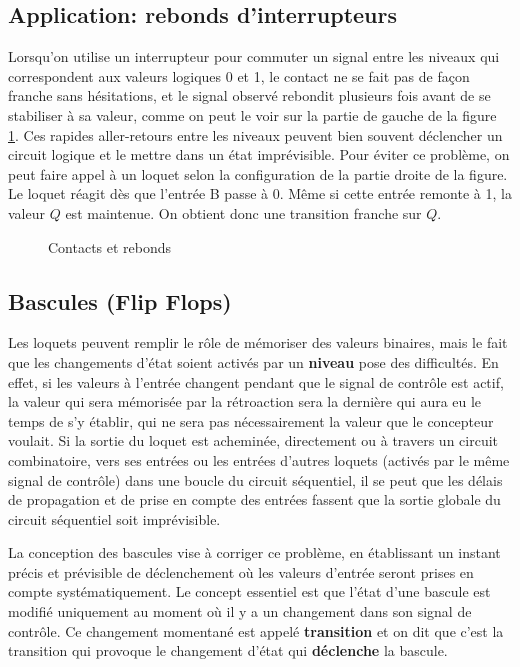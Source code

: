 \documentclass[11pt]{article}
\begin{document}
\subsection{Application: rebonds d'interrupteurs}
\label{sec:org7a182d0}

Lorsqu'on utilise un interrupteur pour commuter un signal entre les
niveaux qui correspondent aux valeurs logiques 0 et 1, le contact ne
se fait pas de façon franche sans hésitations, et le signal observé
rebondit plusieurs fois avant de se stabiliser à sa valeur, comme on
peut le voir sur la partie de gauche de la figure \ref{fig:orgdbacca0}. Ces
rapides aller-retours entre les niveaux peuvent bien souvent
déclencher un circuit logique et le mettre dans un état
imprévisible. Pour éviter ce problème, on peut faire appel à un loquet
selon la configuration de la partie droite de la figure. Le loquet
réagit dès que l'entrée B passe à 0. Même si cette entrée remonte à 1,
la valeur \(Q\) est maintenue. On obtient donc une transition franche sur
\(Q\).

\begin{figure}[htbp]
\centering

\caption{\label{fig:orgdbacca0}Contacts et rebonds}
\end{figure}

\subsection{Bascules (Flip Flops)}
\label{sec:orgbd46447}

Les loquets peuvent remplir le rôle de mémoriser des valeurs binaires,
mais le fait que les changements d'état soient activés par un \textbf{niveau}
pose des difficultés. En effet, si les valeurs à l'entrée changent
pendant que le signal de contrôle est actif, la valeur qui sera
mémorisée par la rétroaction sera la dernière qui aura eu le temps de
s'y établir, qui ne sera pas nécessairement la valeur que le
concepteur voulait. Si la sortie du loquet est acheminée, directement
ou à travers un circuit combinatoire, vers ses entrées ou les entrées
d'autres loquets (activés par le même signal de contrôle) dans une
boucle du circuit séquentiel, il se peut que les délais de propagation
et de prise en compte des entrées fassent que la sortie globale du
circuit séquentiel soit imprévisible.

La conception des bascules vise à corriger ce problème, en établissant
un instant précis et prévisible de déclenchement où les valeurs
d'entrée seront prises en compte systématiquement. Le concept
essentiel est que l'état d'une bascule est modifié uniquement au
moment où il y a un changement dans son signal de contrôle. Ce
changement momentané est appelé \textbf{transition} et on dit que c'est la
transition qui provoque le changement d'état qui \textbf{déclenche} la
bascule.
\end{document}
